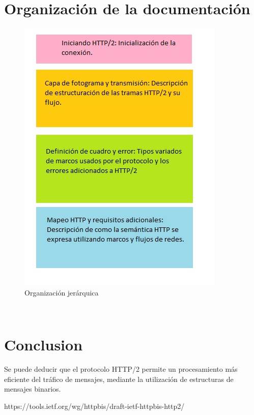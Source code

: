 \documentclass[spanish]{udpreport}
\begin{document}
\chapter{Organización de la documentación}
\begin{figure}[h]
    \centering
    \includegraphics{images/qq1.jpg}
    \caption{Organización jerárquica}
    \label{fig:my_label}
\end{figure}
\\
\chapter{Conclusion}
Se puede deducir que el protocolo HTTP/2 permite un procesamiento más eficiente del tráfico de mensajes, mediante la utilización de estructuras  de mensajes binarios. 
\\
\begin{thebibliography}{0}
https://tools.ietf.org/wg/httpbis/draft-ietf-httpbis-http2/ \\ 
\end{thebibliography}
\listoffigures
\end{document}
